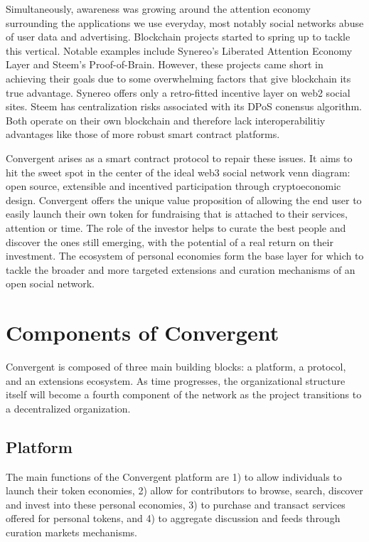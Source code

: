 \documentclass[a4paper, 10pt]{article}
\begin{document}
Simultaneously, awareness was growing around the attention economy surrounding the applications we use everyday, most notably social networks abuse of user data and advertising. Blockchain projects started to spring up to tackle this vertical. Notable examples include Synereo's Liberated Attention Economy Layer\cite{synereo} and Steem's Proof-of-Brain\cite{steem}. However, these projects came short in achieving their goals due to some overwhelming factors that give blockchain its true advantage. Synereo offers only a retro-fitted incentive layer on web2 social sites. Steem has centralization risks associated with its DPoS conensus algorithm. Both operate on their own blockchain and therefore lack interoperabilitiy advantages like those of more robust smart contract platforms.

Convergent arises as a smart contract protocol to repair these issues. It aims to hit the sweet spot in the center of the ideal web3 social network venn diagram: open source, extensible and incentived participation through cryptoeconomic design. Convergent offers the unique value proposition of allowing the end user to easily launch their own token for fundraising that is attached to their services, attention or time. The role of the investor helps to curate the best people and discover the ones still emerging, with the potential of a real return on their investment. The ecosystem of personal economies form the base layer for which to tackle the broader and more targeted extensions and curation mechanisms of an open social network.

\section{Components of Convergent}

Convergent is composed of three main building blocks: a platform, a protocol, and an extensions ecosystem. As time progresses, the organizational structure itself will become a fourth component of the network as the project transitions to a decentralized organization. 

\subsection{Platform}

The main functions of the Convergent platform are 1) to allow individuals to launch their token economies, 2) allow for contributors to browse, search, discover and invest into these personal economies, 3) to purchase and transact services offered for personal tokens, and 4) to aggregate discussion and feeds through curation markets mechanisms.
\end{document}
